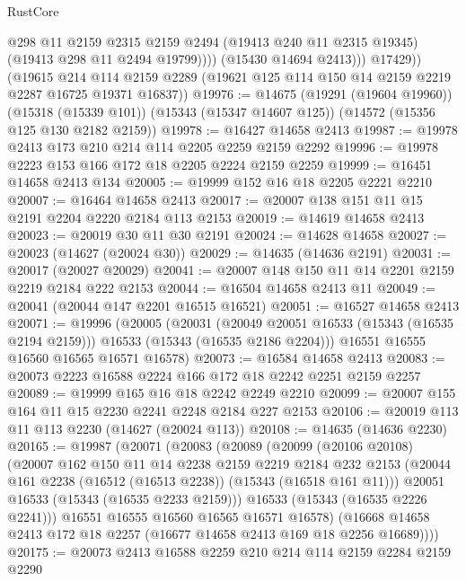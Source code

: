 \begin{lexlean}{RustCore}
\begin{coremodule}
                  @298
                  @11
                  @2159
                  @2315
                  @2159
                  @2494
                  (@19413 @240 @11 @2315 @19345)
                  (@19413 @298 @11 @2494 @19799))))
            (@15430 @14694 @2413)))
        @17429))
    (@19615
      @214
      @114
      @2159
      @2289
      (@19621 @125 @114 @150 @14 @2159 @2219 @2287 @16725 @19371 @16837))
@19976 := @14675
    (@19291 (@19604 @19960))
    (@15318 (@15339 @101))
    (@15343 (@15347 @14607 @125))
    (@14572 (@15356 @125 @130 @2182 @2159))
@19978 := @16427 @14658 @2413
@19987 := @19978 @2413 @173 @210 @214 @114 @2205 @2259 @2159 @2292
@19996 := @19978 @2223 @153 @166 @172 @18 @2205 @2224 @2159 @2259
@19999 := @16451 @14658 @2413 @134
@20005 := @19999 @152 @16 @18 @2205 @2221 @2210
@20007 := @16464 @14658 @2413
@20017 := @20007 @138 @151 @11 @15 @2191 @2204 @2220 @2184 @113 @2153
@20019 := @14619 @14658 @2413
@20023 := @20019 @30 @11 @30 @2191
@20024 := @14628 @14658
@20027 := @20023 (@14627 (@20024 @30))
@20029 := @14635 (@14636 @2191)
@20031 := @20017 (@20027 @20029)
@20041 := @20007 @148 @150 @11 @14 @2201 @2159 @2219 @2184 @222 @2153
@20044 := @16504 @14658 @2413 @11
@20049 := @20041 (@20044 @147 @2201 @16515 @16521)
@20051 := @16527 @14658 @2413
@20071 := @19996
    (@20005
      (@20031
        (@20049 @20051 @16533 (@15343 (@16535 @2194 @2159)))
        @16533
        (@15343 (@16535 @2186 @2204)))
      @16551
      @16555
      @16560
      @16565
      @16571
      @16578)
@20073 := @16584 @14658 @2413
@20083 := @20073 @2223 @16588 @2224 @166 @172 @18 @2242 @2251 @2159 @2257
@20089 := @19999 @165 @16 @18 @2242 @2249 @2210
@20099 := @20007 @155 @164 @11 @15 @2230 @2241 @2248 @2184 @227 @2153
@20106 := @20019 @113 @11 @113 @2230 (@14627 (@20024 @113))
@20108 := @14635 (@14636 @2230)
@20165 := @19987
    (@20071
      (@20083
        (@20089
          (@20099
            (@20106 @20108)
            (@20007
              @162
              @150
              @11
              @14
              @2238
              @2159
              @2219
              @2184
              @232
              @2153
              (@20044 @161 @2238 (@16512 (@16513 @2238)) (@15343 (@16518 @161 @11)))
              @20051
              @16533
              (@15343 (@16535 @2233 @2159)))
            @16533
            (@15343 (@16535 @2226 @2241)))
          @16551
          @16555
          @16560
          @16565
          @16571
          @16578)
        (@16668 @14658 @2413 @172 @18 @2257 (@16677 @14658 @2413 @169 @18 @2256 @16689))))
@20175 := @20073 @2413 @16588 @2259 @210 @214 @114 @2159 @2284 @2159 @2290

\end{coremodule}
\end{lexlean}
